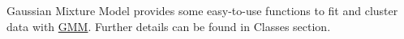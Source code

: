 Gaussian Mixture Model provides some easy-\/to-\/use functions to fit and cluster data with \hyperlink{class_g_m_m}{G\+M\+M}. Further details can be found in Classes section. 